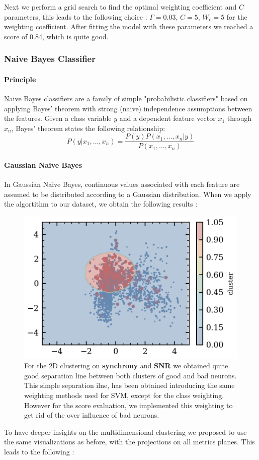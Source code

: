 \documentclass[11pt,a4paper]{report}
\begin{document}
\begin{multicols}{2}
    Next we perform a grid search to find the optimal weighting coefficient and $C$ parameters, this leads to the following choice : $\Gamma = 0.03$, $C = 5$, $W_c = 5$ for the weighting coefficient.
    After fitting the model with these parameters we  reached a score of 0.84, which is quite good.

    \subsubsection{Naive Bayes Classifier}
    \paragraph{Principle}
    Naive Bayes classifiers are a family of simple "probabilistic classifiers" \cite{GaussianBayes} based on applying Bayes' theorem with strong (naive) independence assumptions between the features.
    Given a class variable $y$ and a dependent feature vector $x_1$ through $x_n$, Bayes' theorem states the following relationship:
    $$P(y | x_1, \dots, x_n) = \frac{P(y) P(x_1, \dots, x_n | y)}{P(x_1, \dots, x_n)}$$
    \paragraph{Gaussian Naive Bayes}
    In Gaussian Naive Bayes, continuous values associated with each feature are assumed to be distributed according to a Gaussian distribution.
    When we apply the algortithm to our dataset, we obtain the following results :

    \begin{figure}[H]
        \centering
        \includegraphics[width=0.9\linewidth]{figure/cluster_GaussianNB.png}
        \caption{For the 2D clustering on \textbf{synchrony} and \textbf{SNR} we obtained quite good separation line between both clusters of good and bad neurons. This simple separation ilne, has been obtained introducing the same weighting methods used for SVM, except for the class weighting. However for the score evaluation, we implemented this weighting to get rid of the over influence of bad neurons.}
        \label{}
    \end{figure}
    To have deeper insights on the multidimensional clustering we proposed to use the same visualizations as before, with the projections on all metrics planes. This leads to the following :

\end{multicols}
\end{document}
